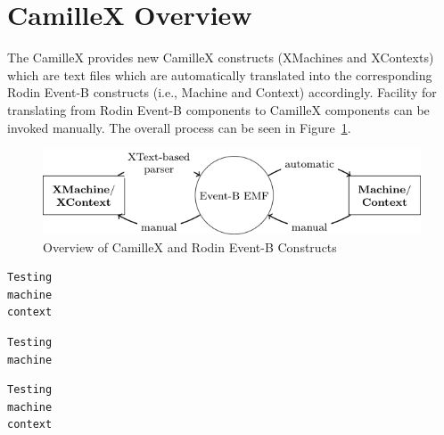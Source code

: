 \section{CamilleX Overview}
\label{sec:overview}

The CamilleX provides new CamilleX constructs (XMachines and XContexts) which are text files which are automatically translated into the corresponding Rodin Event-B constructs (i.e., Machine and Context) accordingly.  Facility for translating from Rodin Event-B components to CamilleX components can be invoked manually. The overall process can be seen in Figure~\ref{fig:overview}.
\begin{figure}[!htbp]
  \centering
  \includegraphics{tikz-overview.png}
  \caption{Overview of CamilleX and Rodin Event-B Constructs}
  \label{fig:overview}
\end{figure}

\begin{lstlisting}[language=Event-B]
Testing
machine
context
\end{lstlisting}
\endif
{}
\begin{verbatim}
Testing
machine
\end{verbatim}
\endif
{}
\begin{lstlisting}[language=Event-B]
Testing
machine
context
\end{lstlisting}
\endif


